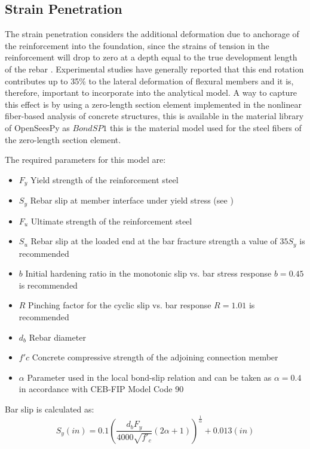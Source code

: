 \subsection{Strain Penetration}

The strain penetration considers the additional deformation due to anchorage of the reinforcement into the foundation, since the strains of tension in the reinforcement will drop to zero at a depth equal to the true development length of the rebar \cite{Priestley2007}. Experimental studies have generally reported that this end rotation contributes up to 35\% to the lateral deformation of flexural members\cite{Zhao2007} and it is, therefore, important to incorporate into the analytical model. A way to capture this effect is by using a zero-length section element implemented in the nonlinear fiber-based analysis of concrete structures, this is available in the material library of OpenSeesPy as $Bond SP1$ \cite{Zhao2007} this is the material model used for the steel fibers of the zero-length section element.

The required parameters for this model are:
\begin{itemize}
	\item $F_{y}$ Yield strength of the reinforcement steel
	\item $S_{y}$ Rebar slip at member interface under yield stress (see )
	\item $F_{u}$ Ultimate strength of the reinforcement steel
	\item $S_{u}$ Rebar slip at the loaded end at the bar fracture strength a value of $35 S_{y}$ is recommended \cite{Zhao2007}
	\item $b$ Initial hardening ratio in the monotonic slip vs. bar stress response $b=0.45$ is recommended \cite{Zhao2007}
	\item $R$ Pinching factor for the cyclic slip vs. bar response $R=1.01$ is recommended \cite{Zhao2007}
	\item $d_b$ Rebar diameter
	\item $f'c$ Concrete compressive strength of the adjoining connection member
	\item $\alpha$ Parameter used in the local bond-slip relation and can be taken as $\alpha=0.4$ in accordance with CEB-FIP Model Code 90 \cite{CEB1993}
\end{itemize}

Bar slip is calculated as:
\begin{equation}
	S_{y}(in)=0.1\left(\frac{d_{b}F_{y}}{4000\sqrt{f'_{c}}}\left(2\alpha+1\right)\right)^{\frac{1}{\alpha}}+0.013 (in)
	\label{eq.Rebar_Slip}
\end{equation}
